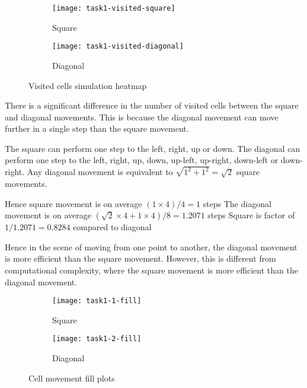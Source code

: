\begin{figure}[ht]
    \centering
    \begin{subfigure}{0.45\textwidth}
        \texttt{[image: task1-visited-square]}
        \caption[Square]{Square}
        \label{fig:task1-visited-square}
    \end{subfigure}
    \begin{subfigure}{0.45\textwidth}
        \texttt{[image: task1-visited-diagonal]}
        \caption[Diagonal]{Diagonal}
        \label{fig:task1-visited-diagonal}
    \end{subfigure}
    \caption[Visited cells simulation heatmap]{Visited cells simulation heatmap}
    \label{fig:task1-visited}
\end{figure}

There is a significant difference in the number of visited cells between the square and diagonal movements.
This is because the diagonal movement can move further in a single step than the square movement.

The square can perform one step to the left, right, up or down.
The diagonal can perform one step to the left, right, up, down, up-left, up-right, down-left or down-right.
Any diagonal movement is equivalent to $\sqrt{1^2 + 1^2} = \sqrt{2}$ square movements.

Hence square movement is on average $(1 \times 4) / 4 = 1$ steps
The diagonal movement is on average $(\sqrt{2} \times 4 + 1 \times 4) / 8 = 1.2071$ steps
Square is factor of $1 / 1.2071 = 0.8284$ compared to diagonal

Hence in the scene of moving from one point to another, the diagonal movement is more efficient than the square movement.
However, this is different from computational complexity, where the square movement is more efficient than the diagonal movement.



\clearpage

\begin{figure}[ht]
    \centering
    \begin{subfigure}{\textwidth}
        \centering
        \texttt{[image: task1-1-fill]}
        \caption[Square]{Square}
        \label{fig:task1-1-fill}
    \end{subfigure}
    \begin{subfigure}{\textwidth}
        \centering
        \texttt{[image: task1-2-fill]}
        \caption[Diagonal]{Diagonal}
        \label{fig:task1-2-fill}
    \end{subfigure}
    \caption[Cell movement fill plots]{Cell movement fill plots}
    \label{fig:task1-fill}
\end{figure}

